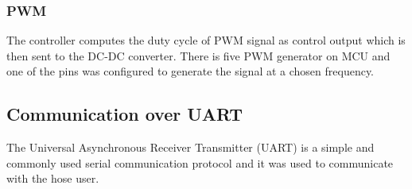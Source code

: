\subsubsection{PWM}
The controller computes the duty cycle of PWM signal as control output which is then sent to the DC-DC converter. There is five PWM generator on MCU and one of the pins was configured to generate the signal at a chosen frequency. 


\subsection{Communication over UART}
The Universal Asynchronous Receiver Transmitter (UART) is a simple and commonly used serial communication protocol and it was used to communicate with the hose user.
